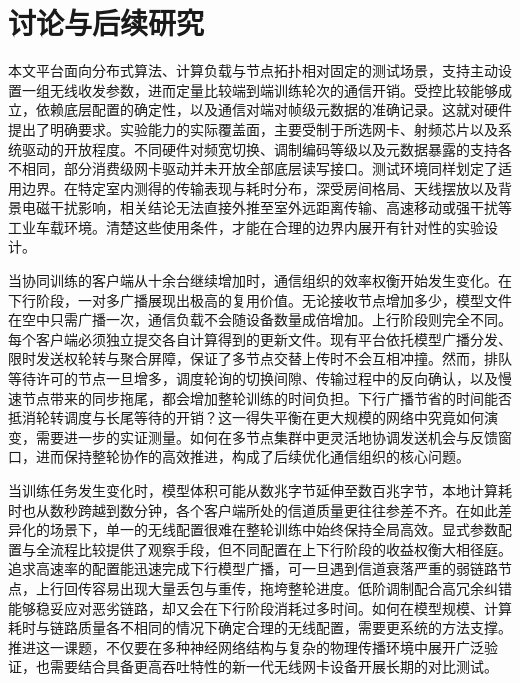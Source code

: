 \section{讨论与后续研究}
\label{sec:5}

本文平台面向分布式算法、计算负载与节点拓扑相对固定的测试场景，支持主动设置一组无线收发参数，进而定量比较端到端训练轮次的通信开销。受控比较能够成立，依赖底层配置的确定性，以及通信对端对帧级元数据的准确记录。这就对硬件提出了明确要求。实验能力的实际覆盖面，主要受制于所选网卡、射频芯片以及系统驱动的开放程度。不同硬件对频宽切换、调制编码等级以及元数据暴露的支持各不相同，部分消费级网卡驱动并未开放全部底层读写接口。测试环境同样划定了适用边界。在特定室内测得的传输表现与耗时分布，深受房间格局、天线摆放以及背景电磁干扰影响，相关结论无法直接外推至室外远距离传输、高速移动或强干扰等工业车载环境。清楚这些使用条件，才能在合理的边界内展开有针对性的实验设计。

当协同训练的客户端从十余台继续增加时，通信组织的效率权衡开始发生变化。在下行阶段，一对多广播展现出极高的复用价值。无论接收节点增加多少，模型文件在空中只需广播一次，通信负载不会随设备数量成倍增加。上行阶段则完全不同。每个客户端必须独立提交各自计算得到的更新文件。现有平台依托模型广播分发、限时发送权轮转与聚合屏障，保证了多节点交替上传时不会互相冲撞。然而，排队等待许可的节点一旦增多，调度轮询的切换间隙、传输过程中的反向确认，以及慢速节点带来的同步拖尾，都会增加整轮训练的时间负担。下行广播节省的时间能否抵消轮转调度与长尾等待的开销？这一得失平衡在更大规模的网络中究竟如何演变，需要进一步的实证测量。如何在多节点集群中更灵活地协调发送机会与反馈窗口，进而保持整轮协作的高效推进，构成了后续优化通信组织的核心问题。

当训练任务发生变化时，模型体积可能从数兆字节延伸至数百兆字节，本地计算耗时也从数秒跨越到数分钟，各个客户端所处的信道质量更往往参差不齐。在如此差异化的场景下，单一的无线配置很难在整轮训练中始终保持全局高效。显式参数配置与全流程比较提供了观察手段，但不同配置在上下行阶段的收益权衡大相径庭。追求高速率的配置能迅速完成下行模型广播，可一旦遇到信道衰落严重的弱链路节点，上行回传容易出现大量丢包与重传，拖垮整轮进度。低阶调制配合高冗余纠错能够稳妥应对恶劣链路，却又会在下行阶段消耗过多时间。如何在模型规模、计算耗时与链路质量各不相同的情况下确定合理的无线配置，需要更系统的方法支撑。推进这一课题，不仅要在多种神经网络结构与复杂的物理传播环境中展开广泛验证，也需要结合具备更高吞吐特性的新一代无线网卡设备开展长期的对比测试。
